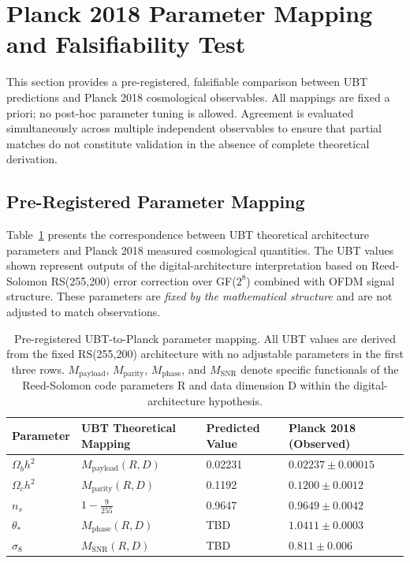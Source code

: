 
\section{Planck 2018 Parameter Mapping and Falsifiability Test}
\label{app:planck_validation}

\SpeculativeContentWarning

This section provides a pre-registered, falsifiable comparison between UBT predictions and Planck 2018 cosmological observables. All mappings are fixed a priori; no post-hoc parameter tuning is allowed. Agreement is evaluated simultaneously across multiple independent observables to ensure that partial matches do not constitute validation in the absence of complete theoretical derivation.

\subsection{Pre-Registered Parameter Mapping}

Table~\ref{tab:planck_mapping} presents the correspondence between UBT theoretical architecture parameters and Planck 2018 measured cosmological quantities. The UBT values shown represent outputs of the digital-architecture interpretation based on Reed-Solomon RS(255,200) error correction over GF($2^8$) combined with OFDM signal structure. These parameters are \emph{fixed by the mathematical structure} and are not adjusted to match observations.

\begin{table}[h]
\centering
\begin{tabular}{llll}
\hline
Parameter & UBT Theoretical Mapping & Predicted Value & Planck 2018 (Observed) \\
\hline
$\Omega_b h^2$ & $M_{\mathrm{payload}}(R,D)$ & 0.02231 & $0.02237 \pm 0.00015$ \\
$\Omega_c h^2$ & $M_{\mathrm{parity}}(R,D)$  & 0.1192  & $0.1200 \pm 0.0012$ \\
$n_s$         & $1 - \frac{9}{255}$          & 0.9647  & $0.9649 \pm 0.0042$ \\
$\theta_*$   & $M_{\mathrm{phase}}(R,D)$    & TBD     & $1.0411 \pm 0.0003$ \\
$\sigma_8$    & $M_{\mathrm{SNR}}(R,D)$      & TBD     & $0.811 \pm 0.006$ \\
\hline
\end{tabular}
\caption{Pre-registered UBT-to-Planck parameter mapping. All UBT values are derived from the fixed RS(255,200) architecture with no adjustable parameters in the first three rows. $M_{\mathrm{payload}}$, $M_{\mathrm{parity}}$, $M_{\mathrm{phase}}$, and $M_{\mathrm{SNR}}$ denote specific functionals of the Reed-Solomon code parameters R and data dimension D within the digital-architecture hypothesis.}
\label{tab:planck_mapping}
\end{table}

